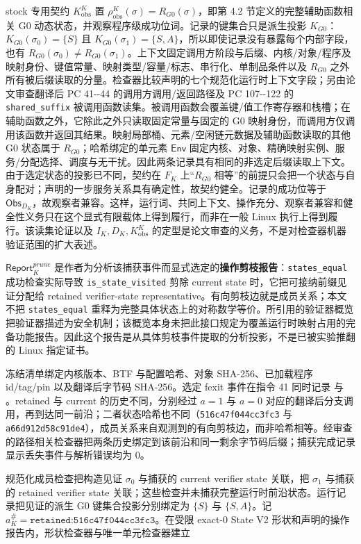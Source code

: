 \documentclass[
  11pt,
  a4paper,
]{ctexart}
\begin{document}
stock 专用契约 \(K^K_{\mathrm{obs}}\) 置
\(\rho^K_{\mathrm{obs}}(\sigma)=R_{G0}(\sigma)\)，即第 4.2
节定义的完整辅助函数相关 G0
动态状态，并观察程序级成功位词。记录的键集合只是派生投影
\(K_{G0}\)：\(K_{G0}(\sigma_0)=\{S\}\) 且
\(K_{G0}(\sigma_1)=\{S,A\}\)，所以即使记录没有暴露每个内部字段，也有
\(R_{G0}(\sigma_0)\ne R_{G0}(\sigma_1)\)。上下文固定调用方阶段与后缀、内核/对象/程序及映射身份、键值常量、映射类型/容量/标志、串行化、单制品条件以及
\(R_{G0}\)
之外所有被后缀读取的分量。检查器比较声明的七个规范化运行时上下文字段；另由论文审查翻译后
PC 41-\/-44 的调用方调用/返回路径及 PC 107-\/-122 的
\texttt{shared\_suffix}
被调用函数读集。被调用函数会覆盖键/值工作寄存器和栈槽；在辅助函数之外，它除此之外只读取固定常量与固定的
G0
映射身份，而调用方仅调用该函数并返回其结果。映射局部桶、元素/空闲链元数据及辅助函数读取的其他
G0 状态属于 \(R_{G0}\)；哈希绑定的单元素 \(\mathsf{Env}\)
固定内核、对象、精确映射实例、服务/分配选择、调度与无干扰。因此两条记录具有相同的非选定后缀读取上下文。由于选定状态的投影已不同，契约在
\(F_K\) 上``\(R_{G0}\)
相等''的前提只会把一个状态与自身配对；声明的一步服务关系具有确定性，故契约健全。记录的成功位等于
\(\mathsf{Obs}_{D_K}\)，故观察者兼容。这样，运行词、共同上下文、操作充分、观察者兼容和健全性义务只在这个显式有限载体上得到履行，而非在一般
Linux 执行上得到履行。该读集论证以及 \(I_K,D_K,K^K_{\mathrm{obs}}\)
的定型是论文审查的义务，不是对检查器机器验证范围的扩大表述。

\(\mathsf{Report}^{\mathit{prune}}_K\)
是作者为分析该捕获事件而显式选定的\textbf{操作剪枝报告}：\texttt{states\_equal}
成功检查实际导致 \texttt{is\_state\_visited} 剪除 current state
时，它把可接纳前缀见证分配给 retained verifier-state
representative。有向剪枝边就是成员关系；本文不把 \texttt{states\_equal}
重释为完整具体状态上的对称数学等价。所引用的验证器概览把验证器描述为安全机制；该概览本身未把此接口规定为覆盖运行时映射占用的完备功能报告。因此这个报告是从具体剪枝事件提取的分析投影，不是已被实验推翻的
Linux 指定证书。

冻结清单绑定内核版本、BTF 与配置哈希、对象 SHA-256、已加载程序
id/tag/pin 以及翻译后字节码 SHA-256。选定 fexit 事件在指令 41 同时记录
 与
。retained 与 current
的历史不同，分别经过 \(a=1\) 与 \(a=0\)
对应的翻译后分支调用，再到达同一前沿；二者状态哈希也不同（\texttt{516c47f044cc3fc3}
与
\texttt{a66d912d58c91de4}），成员关系来自观测到的有向剪枝边，而非哈希相等。经审查的路径相关检查器把两条历史绑定到该前沿和同一剩余字节码后缀；捕获完成记录显示丢失事件与解析错误均为
0。

规范化成员检查把构造见证 \(\sigma_0\) 与捕获的 current verifier state
关联，把 \(\sigma_1\) 与捕获的 retained verifier state
关联；这些检查并未捕获完整运行时前沿状态。运行记录把见证的派生 G0
键集合投影分别绑定为 \(\{S\}\) 与 \(\{S,A\}\)。记
\(a_K^\#=\texttt{retained:516c47f044cc3fc3}\)。在受限 exact-0 State V2
形状和声明的操作报告内，形状检查器与唯一单元检查器建立
\end{document}
